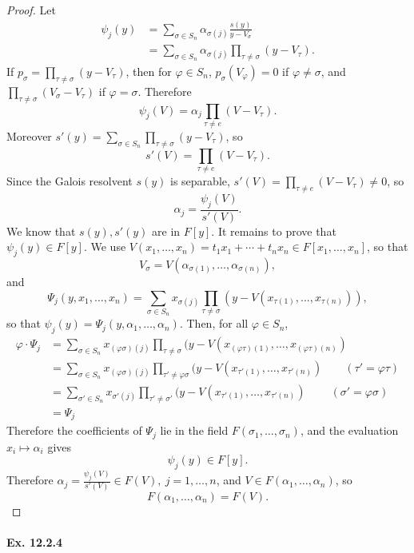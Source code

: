 \documentclass[11pt,a4paper]{article}
\begin{document}
\begin{proof}
Let 
\begin{align*}
\psi_j(y) &= \sum_{\sigma \in S_n} \alpha_{\sigma(j)} \frac{s(y)}{y - V_\sigma}\\
&= \sum_{\sigma \in S_n} \alpha_{\sigma(j)} \prod_{\tau \ne \sigma} (y - V_\tau).
\end{align*}
If $p_\sigma =  \prod_{\tau \ne \sigma} (y - V_\tau)$, then for $\varphi \in S_n$, $p_\sigma(V_\varphi) = 0$ if $\varphi \ne \sigma$, and $\prod_{\tau \ne \sigma} (V_\sigma - V_\tau)$ if $\varphi = \sigma$. Therefore
$$\psi_j(V) = \alpha_j \prod_{\tau \ne e} (V - V_\tau).$$
Moreover $s'(y) = \sum_{\sigma \in S_n} \prod_{\tau \ne \sigma} (y - V_\tau)$, so
$$s'(V)= \prod_{\tau \ne e} (V - V_\tau).$$
Since the Galois resolvent $s(y)$ is separable, $s'(V)= \prod_{\tau\ne e} (V - V_\tau) \ne 0$, so
$$\alpha_j = \frac{\psi_j(V)}{s'(V)}.$$
We know that $s(y), s'(y)$ are in $F[y]$. It remains to prove that $\psi_j(y) \in F[y]$. 
We use $V(x_1,\ldots,x_n) = t_1x_1+\cdots + t_nx_n \in F[x_1,\ldots,x_n]$, so that 
$$V_\sigma  = V(\alpha_{\sigma(1)},\ldots,\alpha_{\sigma(n)}),$$ 
and
$$\Psi_j(y,x_1,\ldots,x_n) =  \sum_{\sigma \in S_n} x_{\sigma(j)} \prod_{\tau \ne \sigma} (y - V(x_{\tau(1)},\ldots,x_{\tau(n)})),$$
so that $\psi_j(y) = \Psi_j(y,\alpha_1,\ldots,\alpha_n)$.
Then, for all $\varphi \in S_n$,
\begin{align*}
\varphi \cdot \Psi_j &= \sum_{\sigma \in S_n} x_{(\varphi \sigma)(j)} \prod_{\tau \ne \sigma} (y - V(x_{(\varphi \tau)(1)},\ldots,x_{(\varphi \tau)(n)})\\
&=\sum_{\sigma \in S_n} x_{(\varphi \sigma)(j)} \prod_{\tau' \ne \varphi \sigma} (y - V(x_{\tau'(1)},\ldots,x_{\tau'(n)}) \qquad (\tau' = \varphi \tau) \\
&= \sum_{\sigma' \in S_n} x_{\sigma'(j)} \prod_{\tau' \ne \sigma'} (y - V(x_{\tau'(1)},\ldots,x_{\tau'(n)}) \ \qquad (\sigma' = \varphi \sigma)\\
&= \Psi_j
\end{align*}
Therefore the coefficients of $\Psi_j$ lie in the field $F(\sigma_1,\ldots,\sigma_n)$, and the evaluation $x_i \mapsto \alpha_i$ gives
$$\psi_j(y) \in F[y].$$
Therefore $\alpha_j = \frac{\psi_j(V)}{s'(V)} \in F(V),\ j=1,\ldots,n$, and $V \in F(\alpha_1,\ldots,\alpha_n)$, so
$$F(\alpha_1,\ldots,\alpha_n) = F(V).$$
\end{proof}

\paragraph{Ex. 12.2.4}
\end{document}
